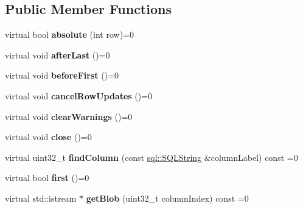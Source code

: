 \subsection*{Public Member Functions}
\begin{DoxyCompactItemize}
\item 
\hypertarget{classsql_1_1_result_set_a95d1955a373ec95159d2aed830009850}{}\label{classsql_1_1_result_set_a95d1955a373ec95159d2aed830009850} 
virtual bool {\bfseries absolute} (int row)=0
\item 
\hypertarget{classsql_1_1_result_set_adea827a4343baff01aff8389e07de5fe}{}\label{classsql_1_1_result_set_adea827a4343baff01aff8389e07de5fe} 
virtual void {\bfseries after\+Last} ()=0
\item 
\hypertarget{classsql_1_1_result_set_a2d48bb6fc075bfb8410137ac33640636}{}\label{classsql_1_1_result_set_a2d48bb6fc075bfb8410137ac33640636} 
virtual void {\bfseries before\+First} ()=0
\item 
\hypertarget{classsql_1_1_result_set_a5496792d1d986843bfd463235a341e35}{}\label{classsql_1_1_result_set_a5496792d1d986843bfd463235a341e35} 
virtual void {\bfseries cancel\+Row\+Updates} ()=0
\item 
\hypertarget{classsql_1_1_result_set_a389ece1efb51689fcd8ad8a4239afc46}{}\label{classsql_1_1_result_set_a389ece1efb51689fcd8ad8a4239afc46} 
virtual void {\bfseries clear\+Warnings} ()=0
\item 
\hypertarget{classsql_1_1_result_set_a344ec045d84d7f987aaa3edf9cf7c32d}{}\label{classsql_1_1_result_set_a344ec045d84d7f987aaa3edf9cf7c32d} 
virtual void {\bfseries close} ()=0
\item 
\hypertarget{classsql_1_1_result_set_a0873c9054a7ba6f97b320a332a7da1a4}{}\label{classsql_1_1_result_set_a0873c9054a7ba6f97b320a332a7da1a4} 
virtual uint32\+\_\+t {\bfseries find\+Column} (const \hyperlink{classsql_1_1_s_q_l_string}{sql\+::\+S\+Q\+L\+String} \&column\+Label) const =0
\item 
\hypertarget{classsql_1_1_result_set_abb1e85abbfca76d9963cf155e4bb4717}{}\label{classsql_1_1_result_set_abb1e85abbfca76d9963cf155e4bb4717} 
virtual bool {\bfseries first} ()=0
\item 
\hypertarget{classsql_1_1_result_set_a72524423ed147c601f06672856a3a12a}{}\label{classsql_1_1_result_set_a72524423ed147c601f06672856a3a12a} 
virtual std\+::istream $\ast$ {\bfseries get\+Blob} (uint32\+\_\+t column\+Index) const =0
\item 
\hypertarget{classsql_1_1_result_set_a1c64b3f8d1506c1e205ccac579a7751e}{}\label{classsql_1_1_result_set_a1c64b3f8d1506c1e205ccac579a7751e} 

\end{DoxyCompactItemize}
